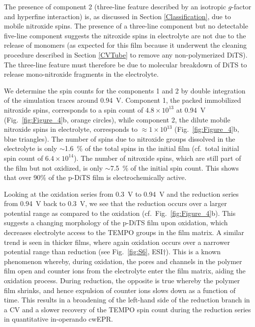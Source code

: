 \par
The presence of component 2 (three-line feature described by an isotropic $g$-factor and hyperfine interaction) is, as discussed in Section \ref{Classification}, due to mobile nitroxide spins. The presence of a three-line component but no detectable five-line component suggests the nitroxide spins in electrolyte are not due to the release of monomers (as expected for this film because it underwent the cleaning procedure described in Section \ref{CVTube} to remove any non-polymerized DiTS). The three-line feature must therefore be due to molecular breakdown of DiTS to release mono-nitroxide fragments in the electrolyte.

\par
We determine the spin counts for the components 1 and 2 by double integration of the simulation traces around 0.94~V. Component 1, the packed immobilized nitroxide spins, corresponds to a spin count of $4.8\times10^{13}$ at 0.94~V (Fig.~\ref{fig:Figure_4}b, orange circles), while component 2, the dilute mobile nitroxide spins in electrolyte, corresponds to $\approx 1\times10^{13}$ (Fig.~\ref{fig:Figure_4}b, blue triangles). The number of spins due to nitroxide groups dissolved in the electrolyte is only $\sim$1.6~\% of the total spins in the initial film (cf.\ total initial spin count of $6.4\times10^{14}$). The number of nitroxide spins, which are still part of the film but not oxidized, is only $\sim$7.5~\% of the initial spin count. This shows that over 90\% of the p-DiTS film is electrochemically active.

\par
Looking at the oxidation series from 0.3~V to 0.94~V and the reduction series from 0.94~V back to 0.3~V, we see that the reduction occurs over a larger potential range as compared to the oxidation (cf.\ Fig.~\ref{fig:Figure_4}b). This suggests a changing morphology of the p-DiTS film upon oxidation, which decreases electrolyte access to the TEMPO groups in the film matrix. A similar trend is seen in thicker films, where again oxidation occurs over a narrower potential range than reduction (see Fig.~\ref{fig:S6}, ESI$\dag$). This is a known phenomenon whereby, during oxidation, the pores and channels in the polymer film open and counter ions from the electrolyte enter the film matrix, aiding the oxidation process. During reduction, the opposite is true whereby the polymer film shrinks, and hence expulsion of counter ions slows down as a function of time. This results in a broadening of the left-hand side of the reduction branch in a CV and a slower recovery of the TEMPO spin count during the reduction series in quantitative in-operando cwEPR. 

